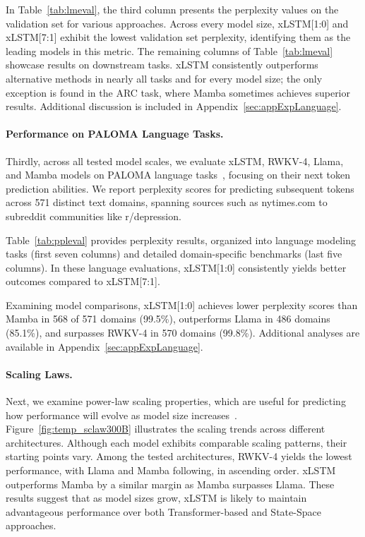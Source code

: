 In Table~\ref{tab:lmeval}, the third column presents the perplexity values on the validation set for various approaches. Across every model size, xLSTM[1:0] and xLSTM[7:1] exhibit the lowest validation set perplexity, identifying them as the leading models in this metric. The remaining columns of Table~\ref{tab:lmeval} showcase results on downstream tasks. xLSTM consistently outperforms alternative methods in nearly all tasks and for every model size; the only exception is found in the ARC task, where Mamba sometimes achieves superior results. Additional discussion is included in Appendix~\ref{sec:appExpLanguage}.

\paragraph{Performance on PALOMA Language Tasks.} Thirdly, across all tested model scales, we evaluate xLSTM, RWKV-4, Llama, and Mamba models on PALOMA language tasks~\citep{Magnusson:23arxivshort}, focusing on their next token prediction abilities. We report perplexity scores for predicting subsequent tokens across 571 distinct text domains, spanning sources such as nytimes.com to subreddit communities like r/depression.

Table~\ref{tab:ppleval} provides perplexity results, organized into language modeling tasks (first seven columns) and detailed domain-specific benchmarks (last five columns). In these language evaluations, xLSTM[1:0] consistently yields better outcomes compared to xLSTM[7:1].

Examining model comparisons, xLSTM[1:0] achieves lower perplexity scores than Mamba in 568 of 571 domains (99.5\%), outperforms Llama in 486 domains (85.1\%), and surpasses RWKV-4 in 570 domains (99.8\%). Additional analyses are available in Appendix~\ref{sec:appExpLanguage}.

\paragraph{Scaling Laws.} Next, we examine power-law scaling properties, which are useful for predicting how performance will evolve as model size increases~\citep{Kaplan:20,Brown:20short}.
Figure~\ref{fig:temp_sclaw300B} illustrates the scaling trends across different architectures. Although each model exhibits comparable scaling patterns, their starting points vary. Among the tested architectures, RWKV-4 yields the lowest performance, with Llama and Mamba following, in ascending order. xLSTM outperforms Mamba by a similar margin as Mamba surpasses Llama. These results suggest that as model sizes grow, xLSTM is likely to maintain advantageous performance over both Transformer-based and State-Space approaches.

